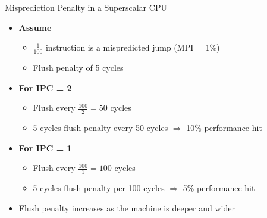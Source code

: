 \documentclass[aspectratio=169,12pt]{beamer}
\begin{document}
\begin{frame}{Misprediction Penalty in a Superscalar CPU}
  \begin{itemize}
    \item \textbf{Assume}
    \begin{itemize}
      \item $\frac{1}{100}$ instruction is a mispredicted jump (MPI = 1\%)
      \item Flush penalty of 5 cycles
    \end{itemize}
    
    \vspace{0.5cm}
    
    \item \textbf{For IPC = 2}
    \begin{itemize}
      \item Flush every $\frac{100}{2} = 50$ cycles
      \item 5 cycles flush penalty every 50 cycles $\Rightarrow$ \alert{10\% performance hit}
    \end{itemize}
    
    \vspace{0.5cm}
    
    \item \textbf{For IPC = 1}
    \begin{itemize}
      \item Flush every $\frac{100}{1} = 100$ cycles
      \item 5 cycles flush penalty per 100 cycles $\Rightarrow$ \alert{5\% performance hit}
    \end{itemize}
    
    \vspace{0.5cm}
    
    \item \alert{Flush penalty increases as the machine is deeper and wider}
  \end{itemize}
\end{frame}
\end{document}
